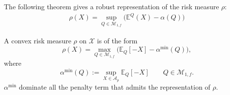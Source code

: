 The following theorem gives a robust representation of the risk measure $\rho$: 
\begin{align*}
	\rho(X) = \sup_{Q \in \mathcal{M}_{1, f}} \bigg( \mathbb{E}^Q(X) - \alpha (Q) \bigg)
\end{align*}

\begin{theorem}
	A convex risk measure $\rho$ on $\mathcal{X}$ is of the form
	\begin{equation}
		\rho(X) = \max_{Q \in \mathcal{M}_{1, f}}  \bigg(\mathbb{E}_Q[-X] - \alpha^{\min}(Q) \bigg),
	\end{equation}
	where
	\begin{equation}
		\alpha^{\min}(Q):= \sup_{X \in \mathcal{A}_p}  \mathbb{E}_Q [-X]  \qquad Q \in \mathcal{M}_{1, f}.
	\end{equation} 
	$\alpha^{\min}$ dominate all the penalty term that admits the representation of $\rho$. 
\end{theorem}
